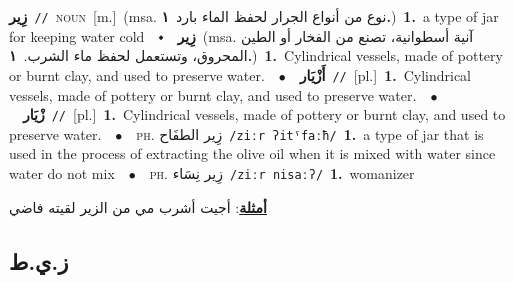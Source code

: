 \documentclass[10pt,a4paper,twoside]{article} %
\begin{document}
\begin{multicols}{2}
{\setlength\topsep{0pt}\textbf{\foreignlanguage{arabic}{زِير}}\ {\color{gray}\texttt{//}\color{black}}\ \textsc{noun}\ [m.]\ \color{gray}(msa. \foreignlanguage{arabic}{نوع من أنواع الجرار لحفظ الماء بارد}~\foreignlanguage{arabic}{\textbf{١.}})\color{black}\ \textbf{1.}~a type of jar for keeping water cold\ \ $\smblkdiamond$\ \ \setlength\topsep{0pt}\textbf{\foreignlanguage{arabic}{زِير}}\ \color{gray}(msa. \foreignlanguage{arabic}{آنية أسطوانية، تصنع من الفخار أو الطين المحروق، وتستعمل لحفظ ماء الشرب.}~\foreignlanguage{arabic}{\textbf{١.}})\color{black}\ \textbf{1.}~Cylindrical vessels, made of pottery or burnt clay, and used to preserve water.\ \ $\bullet$\ \ \setlength\topsep{0pt}\textbf{\foreignlanguage{arabic}{أَزْيَار}}\ {\color{gray}\texttt{//}\color{black}}\ [pl.]\ \textbf{1.}~Cylindrical vessels, made of pottery or burnt clay, and used to preserve water.\ \ $\bullet$\ \ \setlength\topsep{0pt}\textbf{\foreignlanguage{arabic}{زْيَار}}\ {\color{gray}\texttt{//}\color{black}}\ [pl.]\ \textbf{1.}~Cylindrical vessels, made of pottery or burnt clay, and used to preserve water.\ \ $\bullet$\ \ \textsc{ph.} \color{gray} \foreignlanguage{arabic}{زِير الطفَاح}\color{black}\ {\color{gray}\texttt{/{\sffamily ziːr ʔitˤfaːħ}/}\color{black}}\ \textbf{1.}~a type of jar that is used in the process of extracting the olive oil when it is mixed with water since water do not mix\ \ $\bullet$\ \ \textsc{ph.} \color{gray} \foreignlanguage{arabic}{زِير نِسَاء}\color{black}\ {\color{gray}\texttt{/{\sffamily ziːr nisaːʔ}/}\color{black}}\ \textbf{1.}~womanizer\  \begin{flushright}\color{gray}\foreignlanguage{arabic}{\textbf{\underline{\foreignlanguage{arabic}{أمثلة}}}: أجيت أشرب مي من الزير لقيته فاضي}\end{flushright}\color{black}} \vspace{2mm}

\vspace{-3mm}
\subsection*{\color{blue}\foreignlanguage{arabic}{ز.ي.ط}\color{blue}{}} 


\end{multicols}
\end{document}
